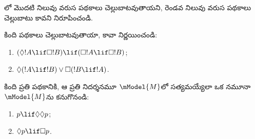 \documentclass[../../../include/open-logic-section]{subfiles}
\begin{document}
\begin{prob}%
  లో
  మొదటి నిలువు వరుస పథకాలు
  చెల్లుబాటవుతాయని, రెండవ నిలువు వరుస
  పథకాలు చెల్లుబాటు కావని నిరూపించండి.
\end{prob}

\begin{prob}
  కింది పథకాలు చెల్లుబాటవుతాయా,
  కావా నిర్ణయించండి:
  \begin{enumerate}
  \item $(\Diamond !A \lif \Box !B) \lif (\Box !A \lif \Box
    !B)$;
  \item $\Diamond(!A \lif !B) \lor \Box(!B \lif !A)$.
  \end{enumerate}
\end{prob}

\begin{prob}
  కింది ప్రతి పథకానికి, ఆ
  ప్రతి నిదర్శనమూ
  $\mModel{M}$లో సత్యమయ్యేలా
  ఒక నమూనా $\mModel{M}$ను కనుగొనండి:
  \begin{enumerate}
  \item $p \lif \Diamond\Diamond p$;
  \item $\Diamond p \lif \Box p$.
  \end{enumerate}
\end{prob}
\end{document}
